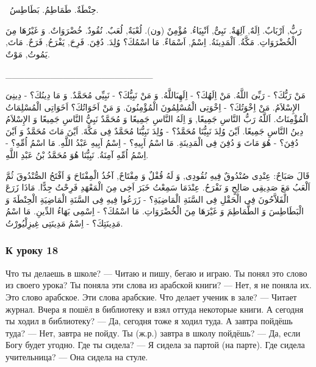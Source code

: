 \documentclass[a5paper]{article}
\begin{document}
\ حِنْطَةٌ. طَمَاطِمُ. بَطَاطِسُ. 

رَبٌّ, اَرْبَابٌ. اِلَهٌ, آلِهَةٌ. نَبِىٌّ, اَنْبِيَاءُ. مُؤْمِنٌ (ون). لُعْبَةٌ, لُعَبٌ. نُقُودٌ. خُضْرَوَاتٌ. وَ غَيْرُهَا مِنَ الْخُضْرَوَاتِ. مَكَّةُ. اَلْمَدِينَةُ. اِسْمٌ, اَسْمَاءٌ. مَا اسْمُكَ؟ وُلِدَ. دُفِنَ. فَرِحَ, يَفْرَحُ, فَرَحٌ. مَاتَ, يَمُوتُ, مَوْتٌ.

\_\_\_\_\_\_\_\_\_\_\_\_\_\_\_\_\_\_\_\_\_\_\_

مَنْ رَبُّكَ؟ - رَبِّىَ اللَّهُ. مَنْ اِلَهُكَ؟ - اِلَهِىَاللَّهُ. وَ مَنْ نَبِيُّكَ؟ - نَبِيِّى مُحَمَّدٌ. وَ مَا دِينُكَ؟ - دِينِىَ الإِسْلاَمُ. مَنْ اِخْوَتُكَ؟ - اِخْوَتِى الْمُسْلِمُونَ الْمُؤْمِنُونَ. وَ مَنْ اَخَوَاتُكَ؟ اَخَوَاتِى الْمُسْلِمَاتُ الْمُؤْمِنَاتُ. اَللَّهُ رَبُّ النَّاسِ جَمِيعًا, وَ اِلَهُ النَّاسِ جَمِيعًا وَ مُحَمَّدٌ نَبِيُّ النَّاسِ جَمِيعًا وَ الإِسْلاَمُ دِينُ النَّاسِ جَمِيعًا. اَيْنَ وُلِدَ نَبِيُّنَا مُحَمَّدٌ؟ - وُلِدَ نَبِيُّنَا مُحَمَّدٌ فِى مَكَّةَ. اَيْنَ مَاتَ مُحَمَّدٌ وَ اَيْنَ دُفِنَ؟ - هُوَ مَاتَ وَ دُفِنَ فِى الْمَدِينَةِ. مَا اسْمُ اَبِيهِ؟ - اِسْمُ اَبِيهِ عَبْدُ اللَّهِ. مَا اسْمُ اُمِّهِ؟ - اِسْمُ اُمِّهِ آمِنَةُ. نَبِيُّنَا هُوَ مُحَمَّدُ بْنُ عَبْدِ اللَّهِ.

قَالَ صَبَاحٌ: عِنْدِى صُنْدُوقٌ فِيهِ نُقُودِى, وَ لَهُ قُفْلٌ وَ مِفْتَاحٌ, آخُذُ الْمِفْتَاحَ وَ اَفْتَحُ الصُّنْدُوقَ ثُمَّ اَلْعَبُ مَعَ صَدِيقِى صَالِحٍ وَ نَفْرَحُ. عِنْدَمَا سَمِعْتُ خَبَرَ اَخِى مِنَ الْمَعْهَدِ فَرِحْتُ جِدًّا. مَاذَا زَرَعَ الْفَلاَّحُونَ فِى الْحَقْلِ فِى السَّنَةِ الْمَاضِيَةِ؟ - زَرَعُوا فِيهِ فِى السَّنَةِ الْمَاضِيَةِ الْحِنْطَةَ وَ الْبَطَاطِسَ وَ الطَّمَاطِمَ وَ غَيْرَهَا مِنَ الْخُضْرَوَاتِ. مَا اسْمُكَ؟ - اِسْمِى بَهَاءُ الدِّينِ. مَا اسْمُ مَدِينَتِكَ؟ - اِسْمُ مَدِينَتِى غِيزِلْيُورْتُ.

\subsubsection{К уроку 18}
Что ты делаешь в школе? — Читаю и пишу, бегаю и играю. Ты понял это слово из своего урока? Ты поняла эти слова из арабской книги? — Нет, я не поняла их. Это слово арабское. Эти слова арабские. Что делает ученик в зале? — Читает журнал. Вчера я пошёл в библиотеку и взял оттуда некоторые книги. А сегодня ты ходил в библиотеку? — Да, сегодня тоже я ходил туда. А завтра пойдёшь туда? — Нет, завтра не пойду. Ты (ж.р.) завтра в школу пой­дёшь? — Да, если Богу будет угодно. Где ты сидела? — Я сидела за партой (на парте). Где сидела учительница? — Она сидела на стуле.
\end{document}
